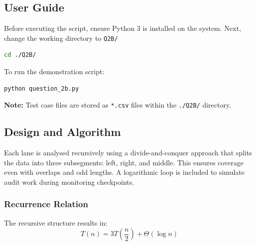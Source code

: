 \documentclass[12pt]{article}
\begin{document}
\subsection{User Guide}


Before executing the script, ensure Python 3 is installed on the system. Next, change the working directory to \texttt{Q2B/}

\begin{lstlisting}[language=bash]
cd ./Q2B/
\end{lstlisting}

\medskip
\noindent To run the demonstration script:

\begin{lstlisting}[language=bash]
python question_2b.py
\end{lstlisting}

\noindent\textbf{Note:} Test case files are stored as \texttt{*.csv} files within the \texttt{./Q2B/} directory.

\subsection{Design and Algorithm}

Each lane is analysed recursively using a divide-and-conquer approach that splits the data into three subsegments: left, right, and middle. This ensures coverage even with overlaps and odd lengths. A logarithmic loop is included to simulate audit work during monitoring checkpoints.

\subsubsection{Recurrence Relation}
The recursive structure results in:
\[
T(n) = 3T\left(\frac{n}{2}\right) + \Theta(\log n)
\]
\end{document}
